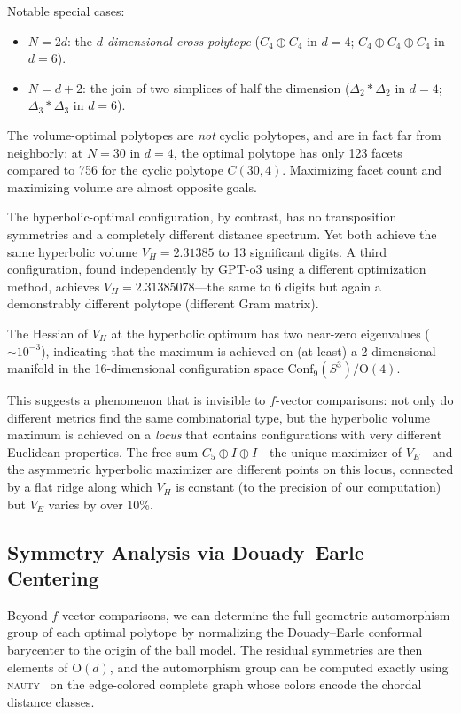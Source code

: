 \documentclass[11pt]{article}
\begin{document}
Notable special cases:
\begin{itemize}
\item $N = 2d$: the \emph{$d$-dimensional cross-polytope}
      ($C_4 \oplus C_4$ in $d = 4$; $C_4 \oplus C_4 \oplus C_4$ in $d = 6$).
\item $N = d + 2$: the join of two simplices of half the dimension
      ($\Delta_2 * \Delta_2$ in $d = 4$; $\Delta_3 * \Delta_3$ in $d = 6$).
\end{itemize}

The volume-optimal polytopes are \emph{not} cyclic polytopes, and
are in fact far from neighborly: at $N = 30$ in $d = 4$, the optimal
polytope has only 123 facets compared to 756 for the cyclic polytope
$C(30,4)$. Maximizing facet count and maximizing volume are almost
opposite goals.

The hyperbolic-optimal configuration, by contrast, has no transposition
symmetries and a completely different distance spectrum.
Yet both achieve the same hyperbolic volume $V_H = 2.31385$ to
13 significant digits. A third configuration, found independently by
GPT-o3 using a different optimization method, achieves
$V_H = 2.31385078$---the same to 6 digits but again a
demonstrably different polytope (different Gram matrix).

The Hessian of $V_H$ at the hyperbolic optimum
has two near-zero eigenvalues ($\sim 10^{-3}$), indicating that
the maximum is achieved on (at least) a 2-dimensional manifold
in the 16-dimensional configuration space
$\mathrm{Conf}_9(S^3) / \mathrm{O}(4)$.

This suggests a phenomenon that is invisible to
$f$-vector comparisons: not only do different metrics find the same
combinatorial type, but the hyperbolic volume maximum is achieved on
a \emph{locus} that contains configurations with very different
Euclidean properties.  The free sum $C_5 \oplus I \oplus I$---the
unique maximizer of $V_E$---and the asymmetric hyperbolic maximizer
are different points on this locus, connected by a flat ridge along
which $V_H$ is constant (to the precision of our computation)
but $V_E$ varies by over 10\%.

\subsection{Symmetry Analysis via Douady--Earle Centering}

Beyond $f$-vector comparisons, we can determine the full geometric
automorphism group of each optimal polytope by normalizing the
Douady--Earle conformal barycenter to the origin of the ball model.
The residual symmetries are then elements of $\mathrm{O}(d)$, and
the automorphism group can be computed exactly using
\textsc{nauty}~\cite{McKayPiperno} on the edge-colored complete graph
whose colors encode the chordal distance classes.
\end{document}
